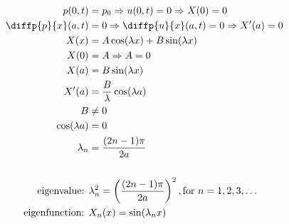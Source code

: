 \documentclass[../../HW06.tex]{subfiles}
\begin{document}
\begin{enumerate}
\begin{align*}
              p(0,t)            & = p_{0} \Rightarrow u(0,t)=0 \Rightarrow X(0)=0           \\
              \diffp{p}{x}(a,t) & = 0 \Rightarrow \diffp{u}{x}(a,t) = 0 \Rightarrow X'(a)=0 \\
              X(x)              & = A\cos(\lambda x) + B\sin(\lambda x)                     \\
              X(0)              & = A \Rightarrow A = 0                                     \\
              X(a)              & = B\sin(\lambda x)                                        \\
              X'(a)             & = \frac{B}{\lambda} \cos(\lambda a)                       \\
              B                 & \ne 0                                                     \\
              \cos(\lambda a)   & = 0                                                       \\
              \lambda_{n}       & = \frac{(2n-1)\pi}{2a} \\
              \\
              \text{eigenvalue: }    & \lambda_{n}^{2} = \left(  \frac{(2n-1)\pi}{2a} \right)^{2}, \text{for } n = 1, 2, 3, \dots \\
              \text{eigenfunction: } & X_{n}(x) = \sin(\lambda_{n}x)
          \end{align*}
\end{enumerate}
\end{document}
